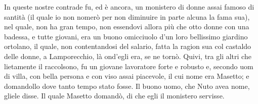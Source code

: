 \documentclass[a4paper,11pt]{book}
\begin{document}
\beginnumbering
{}
\pstart
In queste nostre contrade fu, ed è ancora, un \gls{monistero} di donne assai famoso di santità 
(il quale io non nomerò per non diminuire in parte alcuna la fama sua), nel quale, non ha gran 
tempo, non essendovi allora più che otto donne con una badessa, e tutte giovani, era un buono 
omicciuolo d'un loro bellissimo giardino ortolano, il quale, non contentandosi del salario, fatta la 
ragion sua col castaldo delle donne, a Lamporecchio, là ond'egli era, se ne tornò. Quivi, tra gli 
altri che lietamente il raccolsono, fu un giovane lavoratore forte e robusto e, secondo uom di villa, 
con bella persona e con viso assai piacevole, il cui nome era Masetto; e 
domandollo dove tanto tempo stato fosse. Il buono uomo, che Nuto avea nome, 
gliele disse. Il quale Masetto domandò, di che egli il monistero servisse. 
\pend
\endnumbering
\printindex
\printglossaries
\end{document}
